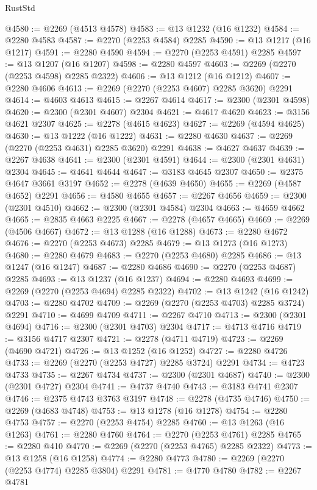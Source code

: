 \begin{lexlean}{RustStd}
\begin{coremodule}
@4580 := @2269 (@4513 @4578)
@4583 := @13 @1232 (@16 @1232)
@4584 := @2280 @4583
@4587 := @2270 (@2253 @4584) @2285
@4590 := @13 @1217 (@16 @1217)
@4591 := @2280 @4590
@4594 := @2270 (@2253 @4591) @2285
@4597 := @13 @1207 (@16 @1207)
@4598 := @2280 @4597
@4603 := @2269 (@2270 (@2253 @4598) @2285 @2322)
@4606 := @13 @1212 (@16 @1212)
@4607 := @2280 @4606
@4613 := @2269 (@2270 (@2253 @4607) @2285 @3620) @2291
@4614 := @4603 @4613
@4615 := @2267 @4614
@4617 := @2300 (@2301 @4598)
@4620 := @2300 (@2301 @4607) @2304
@4621 := @4617 @4620
@4623 := @3156 @4621 @2307
@4625 := @2278 (@4615 @4623)
@4627 := @2269 (@4594 @4625)
@4630 := @13 @1222 (@16 @1222)
@4631 := @2280 @4630
@4637 := @2269 (@2270 (@2253 @4631) @2285 @3620) @2291
@4638 := @4627 @4637
@4639 := @2267 @4638
@4641 := @2300 (@2301 @4591)
@4644 := @2300 (@2301 @4631) @2304
@4645 := @4641 @4644
@4647 := @3183 @4645 @2307
@4650 := @2375 @4647 @3661 @3197
@4652 := @2278 (@4639 @4650)
@4655 := @2269 (@4587 @4652) @2291
@4656 := @4580 @4655
@4657 := @2267 @4656
@4659 := @2300 (@2301 @4510)
@4662 := @2300 (@2301 @4584) @2304
@4663 := @4659 @4662
@4665 := @2835 @4663 @2225
@4667 := @2278 (@4657 @4665)
@4669 := @2269 (@4506 @4667)
@4672 := @13 @1288 (@16 @1288)
@4673 := @2280 @4672
@4676 := @2270 (@2253 @4673) @2285
@4679 := @13 @1273 (@16 @1273)
@4680 := @2280 @4679
@4683 := @2270 (@2253 @4680) @2285
@4686 := @13 @1247 (@16 @1247)
@4687 := @2280 @4686
@4690 := @2270 (@2253 @4687) @2285
@4693 := @13 @1237 (@16 @1237)
@4694 := @2280 @4693
@4699 := @2269 (@2270 (@2253 @4694) @2285 @2322)
@4702 := @13 @1242 (@16 @1242)
@4703 := @2280 @4702
@4709 := @2269 (@2270 (@2253 @4703) @2285 @3724) @2291
@4710 := @4699 @4709
@4711 := @2267 @4710
@4713 := @2300 (@2301 @4694)
@4716 := @2300 (@2301 @4703) @2304
@4717 := @4713 @4716
@4719 := @3156 @4717 @2307
@4721 := @2278 (@4711 @4719)
@4723 := @2269 (@4690 @4721)
@4726 := @13 @1252 (@16 @1252)
@4727 := @2280 @4726
@4733 := @2269 (@2270 (@2253 @4727) @2285 @3724) @2291
@4734 := @4723 @4733
@4735 := @2267 @4734
@4737 := @2300 (@2301 @4687)
@4740 := @2300 (@2301 @4727) @2304
@4741 := @4737 @4740
@4743 := @3183 @4741 @2307
@4746 := @2375 @4743 @3763 @3197
@4748 := @2278 (@4735 @4746)
@4750 := @2269 (@4683 @4748)
@4753 := @13 @1278 (@16 @1278)
@4754 := @2280 @4753
@4757 := @2270 (@2253 @4754) @2285
@4760 := @13 @1263 (@16 @1263)
@4761 := @2280 @4760
@4764 := @2270 (@2253 @4761) @2285
@4765 := @2280 @410
@4770 := @2269 (@2270 (@2253 @4765) @2285 @2322)
@4773 := @13 @1258 (@16 @1258)
@4774 := @2280 @4773
@4780 := @2269 (@2270 (@2253 @4774) @2285 @3804) @2291
@4781 := @4770 @4780
@4782 := @2267 @4781

\end{coremodule}
\end{lexlean}
